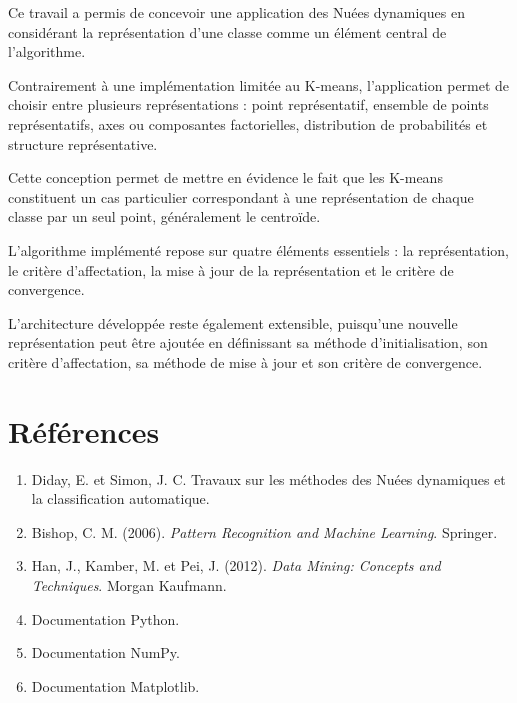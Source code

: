 \documentclass[12pt,a4paper]{report}
\begin{document}
Ce travail a permis de concevoir une application des Nuées dynamiques
en considérant la représentation d'une classe comme un élément central
de l'algorithme.

Contrairement à une implémentation limitée au K-means, l'application
permet de choisir entre plusieurs représentations : point représentatif,
ensemble de points représentatifs, axes ou composantes factorielles,
distribution de probabilités et structure représentative.

Cette conception permet de mettre en évidence le fait que les K-means
constituent un cas particulier correspondant à une représentation de
chaque classe par un seul point, généralement le centroïde.

L'algorithme implémenté repose sur quatre éléments essentiels :
la représentation, le critère d'affectation, la mise à jour de la
représentation et le critère de convergence.

L'architecture développée reste également extensible, puisqu'une
nouvelle représentation peut être ajoutée en définissant sa méthode
d'initialisation, son critère d'affectation, sa méthode de mise à jour
et son critère de convergence.


\chapter*{Références}

\begin{enumerate}

    \item Diday, E. et Simon, J. C.
    Travaux sur les méthodes des Nuées dynamiques et la classification
    automatique.

    \item Bishop, C. M. (2006).
    \textit{Pattern Recognition and Machine Learning}.
    Springer.

    \item Han, J., Kamber, M. et Pei, J. (2012).
    \textit{Data Mining: Concepts and Techniques}.
    Morgan Kaufmann.

    \item Documentation Python.

    \item Documentation NumPy.

    \item Documentation Matplotlib.

\end{enumerate}
\end{document}
